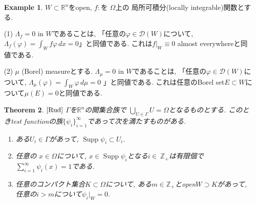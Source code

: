 \documentclass[dvipdfmx,a4paper,11pt]{article} %
\newtheorem{thm}{Theorem}[section]
\theoremstyle{definition}
\newtheorem{ex}[thm]{Example}
\theoremstyle{remark}
\numberwithin{equation}{section}
\newcommand{\N}{\mathbb{Z}_+}
\begin{document}
\begin{ex}
\label{ex-H-19}
\(W \subset \mathbb{R}^n\)をopen,  \(f:\)を \(\Omega\)上の 局所可積分(locally integrable)関数とする.

(1) \(\Lambda_f = 0 \text{ in } W\)であることは, 「任意の$\varphi \in \mathcal{D}(W)$について, 
\( \Lambda_f(\varphi) = \int_W f \varphi \, dx= 0 \)」と同値である. 
これは\( f|_W \equiv 0 \) almost everywhereと同値である. 

(2) \(\mu \) (Borel) measureとする.   
\(\Lambda_\mu = 0 \text{ in } W\)であることは, 「任意の$\varphi \in \mathcal{D}(W)$について, 
\(\Lambda_\mu(\varphi) = \int_W \varphi \, d\mu = 0 \) 」と同値である. 
これは任意のBorel set$E \subset W$について\(\mu(E)=0\)と同値である. 
\end{ex}

\begin{tcolorbox}[mybox]
\begin{thm}{$\cite[Thm 6.20]{Rud}$}
\label{thm-H-20}%
\(\Gamma\)を\(\mathbb{R}^n\)の開集合族で
\(\bigcup_{U \in \Gamma} U = \Omega\)となるものとする. 
このときtest functionの族\(\{\psi_i\}_{i=1}^\infty\)であって次を満たすものがある.  
\begin{enumerate}[label=$(\alph*)$]
\item  ある$U_i \in \Gamma$があって, \(\operatorname{Supp}\psi_i \subset U_i \).
\item 任意の \(x \in \Omega\)について,  $x \in \operatorname{Supp}\psi_i $となる$i \in\ \N$は有限個で
\(\sum_{i=1}^\infty \psi_i(x) = 1\)である. 
\item 任意のコンパクト集合\(K \subset \Omega \)について, ある\(m \in \N\)とopen\(W \supset K\)があって,  
任意の$i > m$について\(\psi_i |_W = 0 \).  
\end{enumerate}
\end{thm}
\end{tcolorbox}
\end{document}
